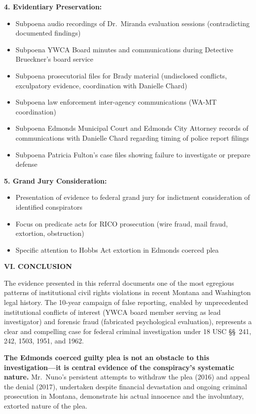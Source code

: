 \documentclass[11pt, letterpaper]{article}
\newcommand{\sectiontitle}[1]{\vspace{0.2in}\noindent\textcolor{NavyBlue}{\large\textbf{#1}}\vspace{0.1in}}
\newcommand{\subsectiontitle}[1]{\vspace{0.15in}\noindent\textcolor{NavyBlue}{\textbf{#1}}\vspace{0.05in}}
\begin{document}
\subsectiontitle{4. Evidentiary Preservation:}
\begin{itemize}[leftmargin=*,itemsep=2pt]
    \item Subpoena audio recordings of Dr.\ Miranda evaluation sessions (contradicting documented findings)
    \item Subpoena YWCA Board minutes and communications during Detective Brueckner's board service
    \item Subpoena prosecutorial files for Brady material (undisclosed conflicts, exculpatory evidence, coordination with Danielle Chard)
    \item Subpoena law enforcement inter-agency communications (WA-MT coordination)
    \item Subpoena Edmonds Municipal Court and Edmonds City Attorney records of communications with Danielle Chard regarding timing of police report filings
    \item Subpoena Patricia Fulton's case files showing failure to investigate or prepare defense
\end{itemize}

\subsectiontitle{5. Grand Jury Consideration:}
\begin{itemize}[leftmargin=*,itemsep=2pt]
    \item Presentation of evidence to federal grand jury for indictment consideration of identified conspirators
    \item Focus on predicate acts for RICO prosecution (wire fraud, mail fraud, extortion, obstruction)
    \item Specific attention to Hobbs Act extortion in Edmonds coerced plea
\end{itemize}

\sectiontitle{VI. CONCLUSION}

The evidence presented in this referral documents one of the most egregious patterns of institutional civil rights violations in recent Montana and Washington legal history. The 10-year campaign of false reporting, enabled by unprecedented institutional conflicts of interest (YWCA board member serving as lead investigator) and forensic fraud (fabricated psychological evaluation), represents a clear and compelling case for federal criminal investigation under 18 USC \S\S\ 241, 242, 1503, 1951, and 1962.

\textbf{The Edmonds coerced guilty plea is not an obstacle to this investigation---it is central evidence of the conspiracy's systematic nature.} Mr.\ Nuno's persistent attempts to withdraw the plea (2016) and appeal the denial (2017), undertaken despite financial devastation and ongoing criminal prosecution in Montana, demonstrate his actual innocence and the involuntary, extorted nature of the plea.
\end{document}
